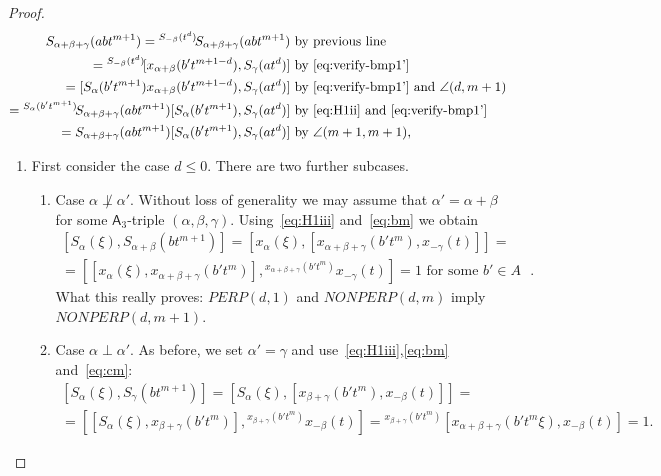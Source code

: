 \documentclass[oneside, 10pt]{amsart}
\newcommand{\rA}{\mathsf{A}}
\numberwithin{equation}{section}
\numberwithin{lemma}{section}
\theoremstyle{definition}
\theoremstyle{remark}
\begin{document}
\begin{proof}
\begin{align*}
 S_{\alpha+\beta+\gamma}(abt^{m+1}) = {}^{S_{-\beta}(t^d)}\!S_{\alpha+\beta+\gamma}(abt^{m+1}) 
 & \text{ by previous line}\\
 = {}^{S_{-\beta}(t^d)}\![x_{\alpha+\beta}(b't^{m+1-d}), S_\gamma(at^d)] 
 & \text{ by~\eqref{eq:verify-bmp1'}} \\
 = [S_{\alpha}(b't^{m+1}) x_{\alpha+\beta}(b't^{m+1-d}), S_\gamma(at^d)] 
 & \text{ by~\eqref{eq:verify-bmp1'} and $\angle(d, m+1)$ }\\
 = {}^{S_{\alpha}(b't^{m+1})}\!S_{\alpha+\beta+\gamma}(abt^{m+1}) [S_{\alpha}(b't^{m+1}), S_\gamma(at^d)] 
 & \text{ by~\eqref{eq:H1ii} and~\eqref{eq:verify-bmp1'}} \\
 = S_{\alpha+\beta+\gamma}(abt^{m+1}) [S_{\alpha}(b't^{m+1}), S_\gamma(at^d)] 
 & \text{ by $\angle(m+1, m+1)$,}
\end{align*}
 

 
\begin{enumerate}
\item \label{case:1} First consider the case $d \leq 0$. There are two further subcases.
 \begin{enumerate}
  \item \label{case:1a} Case $\alpha \not \perp \alpha'$. 
  Without loss of generality we may assume that $\alpha' = \alpha + \beta$
  for some $\rA_3$-triple $(\alpha, \beta, \gamma)$.
  Using~\eqref{eq:H1iii} and~\eqref{eq:bm} we obtain
   \begin{multline} \nonumber
   [S_\alpha(\xi), S_{\alpha+\beta}(bt^{m+1})] = [x_\alpha(\xi), [x_{\alpha+\beta+\gamma}(b't^m), x_{-\gamma}(t)]] = \\   
  = [[x_\alpha(\xi), x_{\alpha+\beta+\gamma}(b't^m)], {}^{x_{\alpha+\beta+\gamma}(b't^m)}\!x_{-\gamma}(t)] = 1 \text{ for some $b'\in A$ }.
  \end{multline}
  What this really proves: $PERP(d, 1)$ and $NONPERP(d, m)$ imply $NONPERP(d, m+1)$.
  \item Case $\alpha \perp \alpha'$. 
  As before, we set $\alpha' = \gamma$ and use~\eqref{eq:H1iii},\eqref{eq:bm} and~\eqref{eq:cm}:
  \begin{multline} \nonumber
   [S_\alpha(\xi), S_{\gamma}(bt^{m+1})] = [S_\alpha(\xi), [x_{\beta+\gamma}(b't^m), x_{-\beta}(t)]] = \\   
  = [[S_\alpha(\xi), x_{\beta+\gamma}(b't^m)], {}^{x_{\beta+\gamma}(b't^m)}\!x_{-\beta}(t)] = {}^{x_{\beta+\gamma}(b't^m)}\![x_{\alpha+\beta+\gamma}(b't^m\xi), x_{-\beta}(t)] = 1.
  \end{multline}
 \end{enumerate} 
  

\end{enumerate}
\end{proof}
\end{document}
